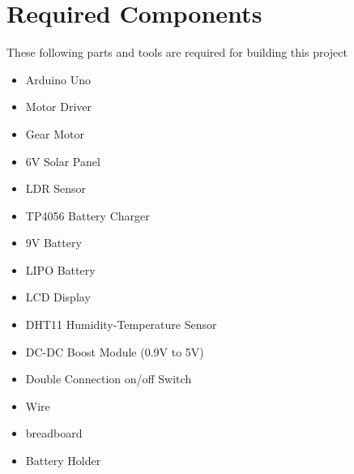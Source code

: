 \section*{Required Components}
These following parts and tools are required for building this project
\begin{itemize}
    \item Arduino Uno
    \item Motor Driver
    \item Gear Motor
    \item 6V Solar Panel
    \item LDR Sensor
    \item TP4056 Battery Charger
    \item 9V Battery
    \item LIPO Battery
    \item LCD Display
    \item DHT11 Humidity-Temperature Sensor
    \item DC-DC Boost Module (0.9V to 5V)
    \item Double Connection on/off Switch
    \item Wire
    \item breadboard
    \item Battery Holder
\end{itemize}
\vspace{1000pt}